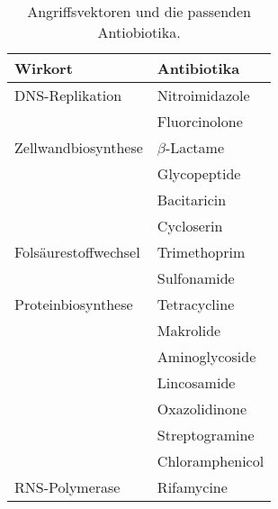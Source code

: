 \begin{description}
		\begin{table}[ht!]
		\begin{center}
			\begin{tabular}{p{4cm} p{3cm}} 
		\toprule
			Wirkort	&	Antibiotika \\
			\midrule
			DNS-Replikation		&	Nitroimidazole \\
										&	Fluorcinolone 	\\
			Zellwandbiosynthese	&	\begin{math}\beta\end{math}-Lactame \\
			\multirow{3}{*}{}		&	Glycopeptide 	\\
										&	Bacitaricin 	\\
										&	Cycloserin 		\\
			Folsäurestoffwechsel	&	Trimethoprim	\\
										&	Sulfonamide 	\\
			Proteinbiosynthese	&	Tetracycline \\
			\multirow{5}{*}{}		&	Makrolide 	\\
										&	Aminoglycoside 	\\
										&	Lincosamide 	\\
										&	Oxazolidinone 	\\
										&	Streptogramine 	\\
										&	Chloramphenicol 	\\
			RNS-Polymerase			&	Rifamycine \\
		\bottomrule
		\end{tabular}
		\caption{Angriffsvektoren und die passenden Antiobiotika.}
		\label{tab:wirkorteantibiose}
		\end{center}
		\end{table}

\end{description}
